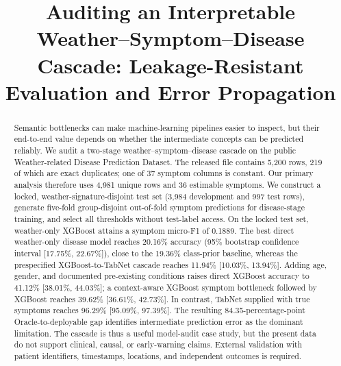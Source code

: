 \documentclass[conference]{IEEEtran}
\begin{document}
\title{Auditing an Interpretable Weather--Symptom--Disease Cascade:
Leakage-Resistant Evaluation and Error Propagation}

\author{
}

\maketitle

\begin{abstract}
Semantic bottlenecks can make machine-learning pipelines easier to inspect,
but their end-to-end value depends on whether the intermediate concepts can be
predicted reliably. We audit a two-stage weather--symptom--disease cascade on
the public Weather-related Disease Prediction Dataset. The released file
contains 5,200 rows, 219 of which are exact duplicates; one of 37 symptom
columns is constant. Our primary analysis therefore uses 4,981 unique rows and
36 estimable symptoms. We construct a locked, weather-signature-disjoint test
set (3,984 development and 997 test rows), generate five-fold group-disjoint
out-of-fold symptom predictions for disease-stage training, and select all
thresholds without test-label access. On the locked test set, weather-only
XGBoost attains a symptom micro-F1 of 0.1889. The best direct weather-only
disease model reaches 20.16\% accuracy (95\% bootstrap confidence interval
[17.75\%, 22.67\%]), close to the 19.36\% class-prior baseline, whereas the
prespecified XGBoost-to-TabNet cascade reaches 11.94\%
[10.03\%, 13.94\%]. Adding age, gender, and documented pre-existing
conditions raises direct XGBoost accuracy to 41.12\%
[38.01\%, 44.03\%]; a context-aware XGBoost symptom bottleneck followed by
XGBoost reaches 39.62\% [36.61\%, 42.73\%]. In contrast, TabNet supplied with
true symptoms reaches 96.29\% [95.09\%, 97.39\%]. The resulting
84.35-percentage-point Oracle-to-deployable gap identifies intermediate
prediction error as the dominant limitation. The cascade is thus a useful
model-audit case study, but the present data do not support clinical,
causal, or early-warning claims. External validation with patient identifiers,
timestamps, locations, and independent outcomes is required.
\end{abstract}
\end{document}
